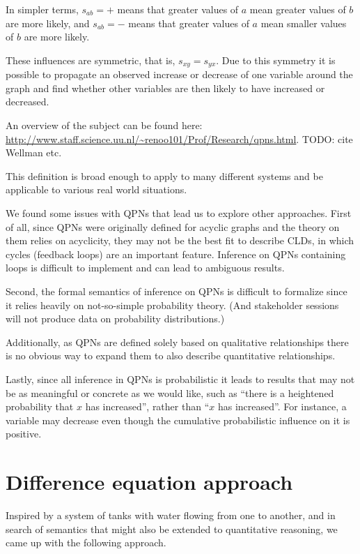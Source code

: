 \documentclass[a4paper,11pt]{article}
\begin{document}
In simpler terms, $s_{ab} = +$ means that greater values of $a$ mean
greater values of $b$ are more likely, and $s_{ab}=-$ means that
greater values of $a$ mean smaller values of $b$ are more likely.

These influences are symmetric, that is, $s_{xy}=s_{yx}$.
%
Due to this symmetry it is possible to propagate an observed increase
or decrease of one variable around the graph and find whether other
variables are then likely to have increased or decreased.

An overview of the subject can be found here:
\url{http://www.staff.science.uu.nl/~renoo101/Prof/Research/qpns.html}.
TODO: cite Wellman etc.

This definition is broad enough to
apply to many different systems and
be applicable to various real world situations.

We found some issues with QPNs that lead us to explore other
approaches.
%
First of all, since QPNs were originally defined for acyclic graphs
and the theory on them relies on acyclicity, they may not be the best
fit to describe CLDs, in which cycles (feedback loops) are an important
feature.
%
Inference on QPNs containing loops is difficult to implement and can
lead to ambiguous results.

Second, the formal semantics of inference on QPNs is difficult to
formalize since it relies heavily on not-so-simple probability theory.
%
(And stakeholder sessions will not produce data on probability
distributions.)

Additionally, as QPNs are defined solely based on qualitative
relationships there is no obvious way to expand them to also describe
quantitative relationships.

Lastly, since all inference in QPNs is probabilistic it leads to
results that may not be as meaningful or concrete as we would like,
such as ``there is a heightened probability that $x$ has increased'',
rather than ``$x$ has increased''.
%
For instance, a variable may decrease even though the cumulative
probabilistic influence on it is positive.

\section{Difference equation approach}

Inspired by a system of tanks with water flowing from one to another,
and in search of semantics that might also be extended to quantitative
reasoning, we came up with the following approach.
\end{document}
